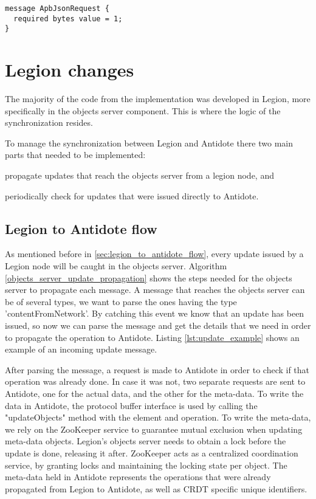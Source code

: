\begin{lstlisting}[caption={Protocol Buffer interface methods after},label={lst:proto2}]
message ApbJsonRequest {
  required bytes value = 1;
}
\end{lstlisting}

\section{Legion changes}
\label{sec:legion_changes}
The majority of the code from the implementation was developed in Legion, more specifically in the objects server component. This is where the logic of the synchronization resides.\par
	To manage the synchronization between Legion and Antidote there two main parts that needed to be implemented: 
\begin{enumerate*}[(i)]
\item propagate updates that reach the objects server from a legion node, and 
\item periodically check for updates that were issued directly to Antidote.
\end{enumerate*}

\subsection{Legion to Antidote flow}
\label{sec:legion_changes_legion_to_antidote_flow}
As mentioned before in \ref{sec:legion_to_antidote_flow}, every update issued by a Legion node will be caught in the objects server. Algorithm \ref{objects_server_update_propagation} shows the steps needed for the objects server to propagate each message. A message that reaches the objects server can be of several types, we want to parse the ones having the type 'contentFromNetwork'. By catching this event we know that an update has been issued, so now we can parse the message and get the details that we need in order to propagate the operation to Antidote. Listing \ref{lst:update_example} shows an example of an incoming update message.\par
	After parsing the message, a request is made to Antidote in order to check if that operation was already done. In case it was not, two separate requests are sent to Antidote, one for the actual data, and the other for the meta-data. To write the data in Antidote, the protocol buffer interface is used by calling the "updateObjects" method with the element and operation. To write the meta-data, we rely on the ZooKeeper service to guarantee mutual exclusion when updating meta-data objects. Legion's objects server needs to obtain a lock before the update is done, releasing it after. ZooKeeper acts as a centralized coordination service, by granting locks and maintaining the locking state per object. The meta-data held in Antidote represents the operations that were already propagated from Legion to Antidote, as well as CRDT specific unique identifiers.
	
